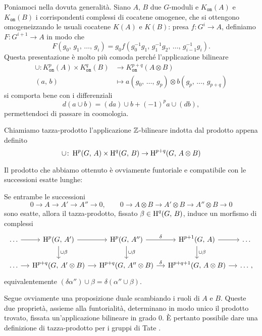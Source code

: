 Poniamoci nella dovuta generalità. Siano $ A, \, B $ due $ G $-moduli e $ K_{\mathtt{om}}(A) $ e $ K_{\mathtt{om}}(B) $ i corrispondenti complessi di cocatene omogenee, che si ottengono omogeneizzando le usuali cocatene $ K(A) $ e $ K(B) $: presa $ f \colon G^i \to A $, definiamo $ F\colon G^{i+1} \to A  $ in modo che
\[ F(g_0, \, g_1, \, \dots, \, g_i) = g_0 f(g_0^{-1}g_1, \, g_1^{-1}g_2, \, \dots, \, g_{i-1}^{-1}g_i). \]
Questa presentazione è molto più comoda perché l'applicazione bilineare
\begin{align*}
	\cup \colon K^p_{\mathtt{om}}(A) \times K^q_{\mathtt{om}}(B) &\to K_{\mathtt{om}}^{p+q}(A \otimes B)\\
	(a, \, b) & \mapsto a(g_0,\, \dots, \, g_p) \otimes b(g_p,\, \dots, \, g_{p+q})
\end{align*}
si comporta bene con i differenziali
\[ d(a \cup b) = (da) \cup b + (-1)^p a \cup (db), \]
permettendoci di passare in coomologia.

\begin{definition}
	Chiamiamo tazza-prodotto l'applicazione $ \mathbb{Z} $-bilineare indotta dal prodotto appena definito
	\[ \cup \colon \operatorname{H}^p(G, \, A) \times \operatorname{H}^q(G, \, B) \to \operatorname{H}^{p+q}(G, \, A \otimes B)  \]
\end{definition}

Il prodotto che abbiamo ottenuto è ovviamente funtoriale e compatibile con le successioni esatte lunghe:

\begin{proposition}\label{cup1}
	Se entrambe le successioni
	\[ 0 \to A \to A' \to A'' \to 0, \qquad 0 \to A \otimes B \to A'\otimes B \to A''\otimes B \to 0 \]
	sono esatte, allora il tazza-prodotto, fissato $ \beta \in \operatorname{H}^q(G, \, B) $, induce un morfismo di complessi
	\[\begin{tikzcd}[column sep = small]
	\dots \rar
	& \HH^{p}(G, \, A') \dar["\cup\beta"] \rar 
	& \HH^{p}(G, \, A'') \rar["\delta"] \dar["\cup\beta"]
	& \HH^{p+1}(G, \, A) \rar \dar["\cup\beta"]
	&\dots  \\
	\dots \rar
	& \HH^{p+q}(G, \, A'\otimes B) \rar
	& \HH^{p+q}(G, \, A''\otimes B) \rar["\delta"]
	& \HH^{p+q+1}(G, \, A\otimes B) \rar &\dots \, , \end{tikzcd}\]
	equivalentemente $ (\delta\alpha'') \cup \beta = \delta (\alpha'' \cup \beta) $.
\end{proposition}

Segue ovviamente una proposizione duale scambiando i ruoli di $ A $ e $ B $. Queste due proprietà, assieme alla funtorialità, determinano in modo unico il prodotto trovato, fissata un'applicazione bilineare in grado 0. È pertanto possibile dare una definizione di tazza-prodotto per i gruppi di Tate \cite[proposizione 1.4.7]{Schmidt}. \\

